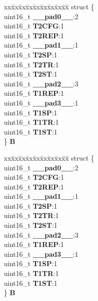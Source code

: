 \begin{DoxyCompactItemize}
\begin{tabbing}
\end{tabbing}\item 
\mbox{\label{unionuTICCR_a00f19888cd5fb1b6b2fcef10776f76fd}} 
\begin{tabbing}
xx\=xx\=xx\=xx\=xx\=xx\=xx\=xx\=xx\=\kill
struct \{\\
\>uint16\_t {\bfseries \_\_pad0\_\_}:2\\
\>uint16\_t {\bfseries T2CFG}:1\\
\>uint16\_t {\bfseries T2REP}:1\\
\>uint16\_t {\bfseries \_\_pad1\_\_}:1\\
\>uint16\_t {\bfseries T2SP}:1\\
\>uint16\_t {\bfseries T2TR}:1\\
\>uint16\_t {\bfseries T2ST}:1\\
\>uint16\_t {\bfseries \_\_pad2\_\_}:3\\
\>uint16\_t {\bfseries T1REP}:1\\
\>uint16\_t {\bfseries \_\_pad3\_\_}:1\\
\>uint16\_t {\bfseries T1SP}:1\\
\>uint16\_t {\bfseries T1TR}:1\\
\>uint16\_t {\bfseries T1ST}:1\\
\} {\bfseries B}\\

\end{tabbing}\item 
\mbox{\label{unionuTICCR_a12ff214fbc5357e5823406219c3891b1}} 
\begin{tabbing}
xx\=xx\=xx\=xx\=xx\=xx\=xx\=xx\=xx\=\kill
struct \{\\
\>uint16\_t {\bfseries \_\_pad0\_\_}:2\\
\>uint16\_t {\bfseries T2CFG}:1\\
\>uint16\_t {\bfseries T2REP}:1\\
\>uint16\_t {\bfseries \_\_pad1\_\_}:1\\
\>uint16\_t {\bfseries T2SP}:1\\
\>uint16\_t {\bfseries T2TR}:1\\
\>uint16\_t {\bfseries T2ST}:1\\
\>uint16\_t {\bfseries \_\_pad2\_\_}:3\\
\>uint16\_t {\bfseries T1REP}:1\\
\>uint16\_t {\bfseries \_\_pad3\_\_}:1\\
\>uint16\_t {\bfseries T1SP}:1\\
\>uint16\_t {\bfseries T1TR}:1\\
\>uint16\_t {\bfseries T1ST}:1\\
\} {\bfseries B}\\


\end{tabbing}
\end{DoxyCompactItemize}
